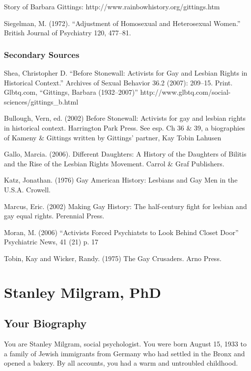 \begin{refsection}
Story of Barbara Gittings: http:\slash \slash www.rainbowhistory.org\slash gittings.htm

Siegelman, M. (1972). “Adjustment of Homosexual and Heterosexual Women.” British Journal of Psychiatry 120, 477--81.

\subsection{Secondary Sources}
\label{secondarysources}

Shea, Christopher D. ``Before Stonewall: Activists for Gay and Lesbian Rights in Historical Context.'' Archives of Sexual Behavior 36.2 (2007): 209--15. Print.
Glbtq.com, “Gittings, Barbara (1932--2007)” http:\slash \slash www.glbtq.com\slash social-sciences\slash gittings\_b.html

Bullough, Vern, ed. (2002) Before Stonewall: Activists for gay and lesbian rights in historical context. Harrington Park Press. See esp. Ch 36 \& 39, a biographies of Kameny \& Gittings written by Gittings' partner, Kay Tobin Lahusen

Gallo, Marcia. (2006). Different Daughters: A History of the Daughters of Bilitis and the Rise of the Lesbian Rights Movement. Carrol \& Graf Publishers.

Katz, Jonathan. (1976) Gay American History: Lesbians and Gay Men in the U.S.A. Crowell.

Marcus, Eric. (2002) Making Gay History: The half-century fight for lesbian and gay equal rights. Perennial Press.

Moran, M. (2006) “Activists Forced Psychiatsts to Look Behind Closet Door” Psychiatric News, 41 (21) p. 17

Tobin, Kay and Wicker, Randy. (1975) The Gay Crusaders. Arno Press.

\chapter{Stanley Milgram, PhD}
\label{stanleymilgramphd}

\section{Your Biography}
\label{yourbiography}

You are Stanley Milgram, social psychologist. You were born August 15, 1933 to a family of Jewish immigrants from Germany who had settled in the Bronx and opened a bakery. By all accounts, you had a warm and untroubled childhood.


\end{refsection}
